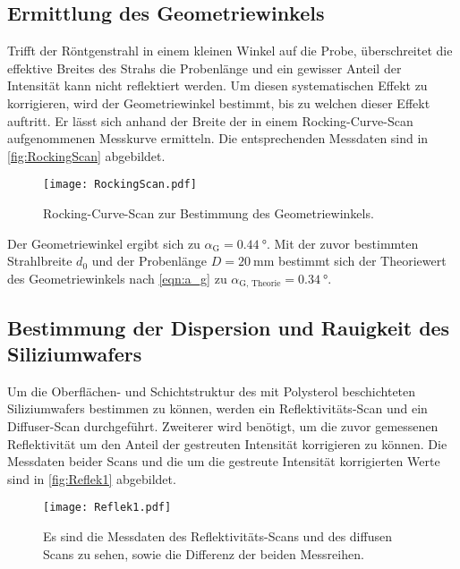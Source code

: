 \subsection{Ermittlung des Geometriewinkels}
Trifft der Röntgenstrahl in einem kleinen Winkel auf die Probe, überschreitet die effektive Breites des Strahs die Probenlänge und ein 
gewisser Anteil der Intensität kann nicht reflektiert werden. Um diesen systematischen Effekt zu korrigieren, wird der Geometriewinkel bestimmt, bis zu welchen dieser 
Effekt auftritt. Er lässt sich anhand der Breite der in einem Rocking-Curve-Scan aufgenommenen Messkurve ermitteln.
Die entsprechenden Messdaten sind in \autoref{fig:RockingScan} abgebildet.
\begin{figure}
  \centering
  \texttt{[image: RockingScan.pdf]}
  \caption{Rocking-Curve-Scan zur Bestimmung des Geometriewinkels.}
  \label{fig:RockingScan}
\end{figure}
Der Geometriewinkel ergibt sich zu $\alpha_\text{G} = \qty{0.44}{\degree}$. Mit der zuvor bestimmten Strahlbreite $d_0$ und der Probenlänge $D = \qty{20}{\milli\metre}$ bestimmt 
sich der Theoriewert des Geometriewinkels nach \autoref{eqn:a_g} zu $\alpha_\text{G, Theorie} = \qty{0.34}{\degree}$.

\subsection{Bestimmung der Dispersion und Rauigkeit des Siliziumwafers}
Um die Oberflächen- und Schichtstruktur des mit Polysterol beschichteten Siliziumwafers bestimmen zu können, werden ein Reflektivitäts-Scan und ein Diffuser-Scan durchgeführt.
Zweiterer wird benötigt, um die zuvor gemessenen Reflektivität um den Anteil der gestreuten Intensität korrigieren zu können. Die Messdaten beider Scans und die um die gestreute 
Intensität korrigierten Werte sind in \autoref{fig:Reflek1} abgebildet.
\begin{figure}
  \centering
  \texttt{[image: Reflek1.pdf]}
  \caption{Es sind die Messdaten des Reflektivitäts-Scans und des diffusen Scans zu sehen, sowie die Differenz der beiden Messreihen.}
  \label{fig:Reflek1}
\end{figure}

